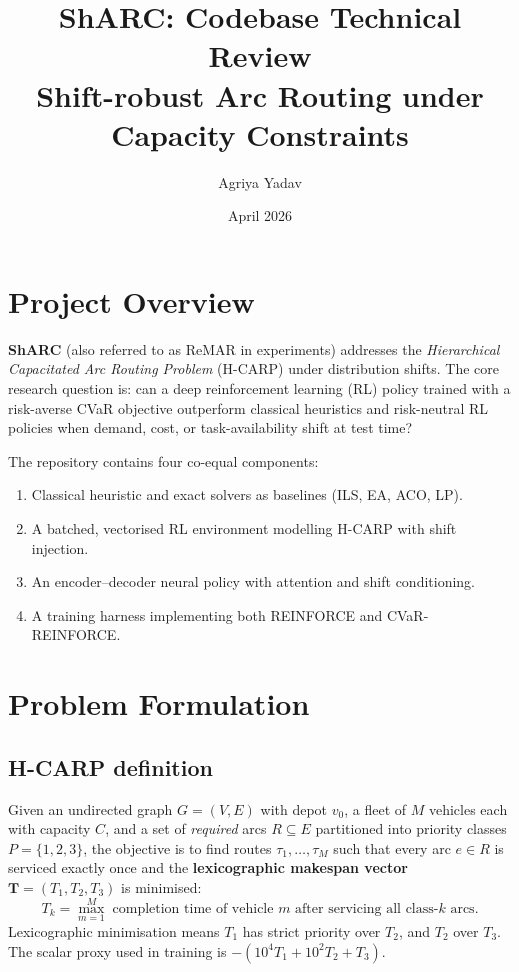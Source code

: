 \documentclass[11pt,a4paper]{article}
\title{\textbf{ShARC: Codebase Technical Review}\\
\large Shift-robust Arc Routing under Capacity Constraints}
\author{Agriya Yadav}
\date{April 2026}
\begin{document}
\maketitle
\tableofcontents
\newpage

\section{Project Overview}

\textbf{ShARC} (also referred to as ReMAR in experiments) addresses the
\emph{Hierarchical Capacitated Arc Routing Problem} (H-CARP) under distribution
shifts. The core research question is: can a deep reinforcement learning (RL)
policy trained with a risk-averse CVaR objective outperform classical heuristics
and risk-neutral RL policies when demand, cost, or task-availability shift at
test time?

The repository contains four co-equal components:
\begin{enumerate}[nosep]
  \item Classical heuristic and exact solvers as baselines (ILS, EA, ACO, LP).
  \item A batched, vectorised RL environment modelling H-CARP with shift
        injection.
  \item An encoder–decoder neural policy with attention and shift conditioning.
  \item A training harness implementing both REINFORCE and CVaR-REINFORCE.
\end{enumerate}

\section{Problem Formulation}

\subsection{H-CARP definition}

Given an undirected graph $G=(V,E)$ with depot $v_0$, a fleet of $M$ vehicles
each with capacity $C$, and a set of \emph{required} arcs $R \subseteq E$
partitioned into priority classes $P=\{1,2,3\}$, the objective is to find routes
$\tau_1,\ldots,\tau_M$ such that every arc $e \in R$ is serviced exactly once
and the \textbf{lexicographic makespan vector} $\mathbf{T}=(T_1,T_2,T_3)$ is
minimised:
\begin{equation}
  T_k = \max_{m=1}^{M}\; \text{completion time of vehicle } m
  \text{ after servicing all class-}k\text{ arcs.}
\end{equation}
Lexicographic minimisation means $T_1$ has strict priority over $T_2$, and $T_2$
over $T_3$. The scalar proxy used in training is
$-\!(10^4 T_1 + 10^2 T_2 + T_3)$.
\end{document}
